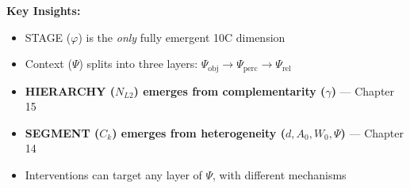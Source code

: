 \begin{tcolorbox}[colback=blue!5!white, colframe=blue!75!black,
    title=\textbf{The Emergence Chain (Refined)}]
\begin{center}
\end{center}

\textbf{Key Insights:}
\begin{itemize}[nosep]
    \item STAGE ($\varphi$) is the \textit{only} fully emergent 10C dimension
    \item Context ($\Psi$) splits into three layers: $\Psi_{\text{obj}} \rightarrow \Psi_{\text{perc}} \rightarrow \Psi_{\text{rel}}$
    \item \textbf{HIERARCHY ($N_{L2}$) emerges from complementarity ($\gamma$)} --- Chapter 15
    \item \textbf{SEGMENT ($C_k$) emerges from heterogeneity ($d, A_0, W_0, \Psi$)} --- Chapter 14
    \item Interventions can target any layer of $\Psi$, with different mechanisms
\end{itemize}

\end{tcolorbox}

